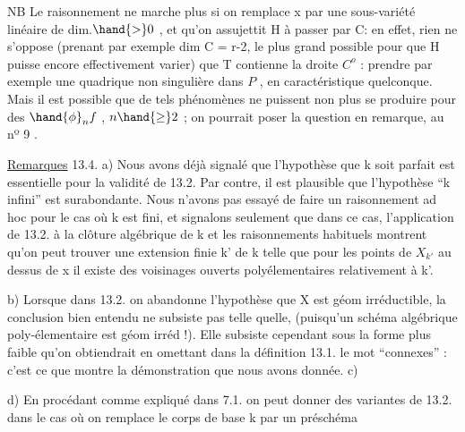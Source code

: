 
NB \quad Le raisonnement ne marche plus si on remplace x par une
sous-variété linéaire  de dim.$\hand{>}0$ , et qu'on assujettit H à passer
par C: en effet, rien ne s'oppose (prenant par exemple dim C = r-2, le
plus grand possible pour que H puisse encore effectivement varier) que
T contienne la droite $C^{o}$ :
 prendre par
exemple une quadrique non singulière dans $P$ , en caractéristique quelconque. Mais il
est possible que de tels phénomènes ne puissent non plus se produire 
pour des $\hand{\phi}_n f$ , $n\hand{\geq} 2$ ; on pourrait poser la question en remarque, au
nº 9 .

\uline{Remarques} 13.4. \quad a) Nous avons déjà signalé que l'hypothèse que k 
soit parfait est essentielle pour la validité de 13.2. Par contre, il
est plausible que l'hypothèse ``k infini'' est surabondante. 
Nous n'avons pas essayé  de faire un raisonnement ad hoc pour le cas
où k est fini, et signalons seulement que dans ce cas, l'application de
13.2. à la clôture algébrique de k et les raisonnements habituels
montrent qu'on peut trouver une extension finie k' de k telle que
 pour les points de $X_{k'}$ au dessus de x il existe des voisinages ouverts
polyélementaires relativement à k'.

b) Lorsque dans 13.2. on abandonne l'hypothèse que X est géom
irréductible, la conclusion bien entendu ne subsiste pas telle quelle,
(puisqu'un schéma algébrique poly-élementaire est géom irréd !). Elle
subsiste cependant sous la forme plus faible qu'on obtiendrait en
omettant dans la définition 13.1. le mot ``connexes'' : c'est ce que
montre la démonstration que nous avons donnée.
c)

d) En procédant comme expliqué dans 7.1. on peut donner des variantes
de 13.2. dans le cas où on remplace le corps de base k par un préschéma
